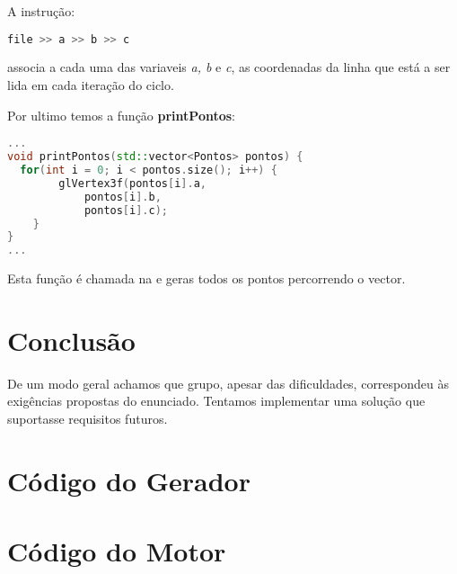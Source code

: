 \documentclass{article}
\begin{document}
\begin{info} %
	A instrução:
	\begin{lstlisting}[language=C++]
		file >> a >> b >> c
	\end{lstlisting}
	associa a cada uma das variaveis \textit{a, b} e \textit{c}, as coordenadas da linha que está a ser lida em cada iteração do ciclo.
\end{info}

Por ultimo temos a função \textbf{printPontos}:

\begin{file}
	\begin{lstlisting}[language=C++]
...
void printPontos(std::vector<Pontos> pontos) {
  for(int i = 0; i < pontos.size(); i++) {
		glVertex3f(pontos[i].a,
			pontos[i].b, 
			pontos[i].c);
	}
}
...
	\end{lstlisting}
\end{file}

Esta função é chamada na  e geras todos os pontos percorrendo o vector.

\newpage
\section{Conclusão}
De um modo geral achamos que grupo, apesar das dificuldades,  correspondeu às exigências propostas do enunciado. Tentamos implementar uma solução que suportasse requisitos futuros.  

\newpage
\appendix

\section{Código do Gerador}

\newpage

\section{Código do Motor}
\end{document}
